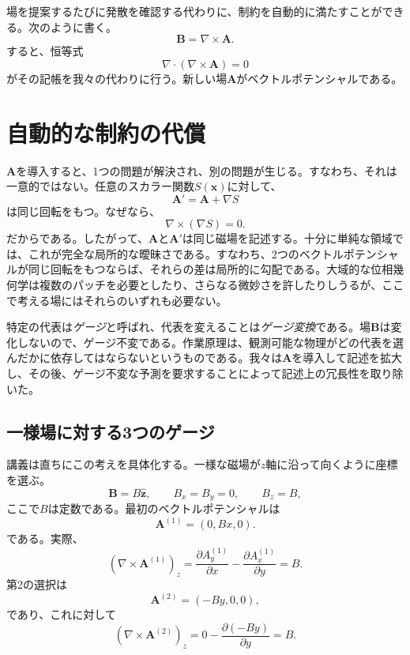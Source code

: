 場を提案するたびに発散を確認する代わりに、制約を自動的に満たすことができる。次のように書く。
\begin{equation}
  \boxed{\mathbf B=\nabla\times\mathbf A}.
\end{equation}
すると、恒等式
\begin{equation}
  \nabla\cdot(\nabla\times\mathbf A)=0
\end{equation}
がその記帳を我々の代わりに行う。新しい場\(\mathbf A\)がベクトルポテンシャルである。

\section{自動的な制約の代償}

\(\mathbf A\)を導入すると、1つの問題が解決され、別の問題が生じる。すなわち、それは一意的ではない。任意のスカラー関数\(S(\mathbf x)\)に対して、
\begin{equation}
  \mathbf A'=\mathbf A+\nabla S
\end{equation}
は同じ回転をもつ。なぜなら、
\begin{equation}
  \nabla\times(\nabla S)=0.
\end{equation}
だからである。したがって、\(\mathbf A\)と\(\mathbf A'\)は同じ磁場を記述する。十分に単純な領域では、これが完全な局所的な曖昧さである。すなわち、2つのベクトルポテンシャルが同じ回転をもつならば、それらの差は局所的に勾配である。大域的な位相幾何学は複数のパッチを必要としたり、さらなる微妙さを許したりしうるが、ここで考える場にはそれらのいずれも必要ない。

特定の代表は\emph{ゲージ}と呼ばれ、代表を変えることは\emph{ゲージ変換}である。場\(\mathbf B\)は変化しないので、ゲージ不変である。作業原理は、観測可能な物理がどの代表を選んだかに依存してはならないというものである。我々は\(\mathbf A\)を導入して記述を拡大し、その後、ゲージ不変な予測を要求することによって記述上の冗長性を取り除いた。

\subsection{一様場に対する3つのゲージ}

講義は直ちにこの考えを具体化する。一様な磁場が\(z\)軸に沿って向くように座標を選ぶ。
\begin{equation}
  \mathbf B=B\hat{\mathbf z},
  \qquad
  B_x=B_y=0,
  \qquad
  B_z=B,
\end{equation}
ここで\(B\)は定数である。最初のベクトルポテンシャルは
\begin{equation}
  \mathbf A^{(1)}=(0,Bx,0).
\end{equation}
である。実際、
\begin{equation}
  (\nabla\times\mathbf A^{(1)})_z
  =
  \frac{\partial A_y^{(1)}}{\partial x}
  -
  \frac{\partial A_x^{(1)}}{\partial y}
  =B.
\end{equation}
第2の選択は
\begin{equation}
  \mathbf A^{(2)}=(-By,0,0),
\end{equation}
であり、これに対して
\begin{equation}
  (\nabla\times\mathbf A^{(2)})_z
  =
  0-\frac{\partial(-By)}{\partial y}
  =B.
\end{equation}

